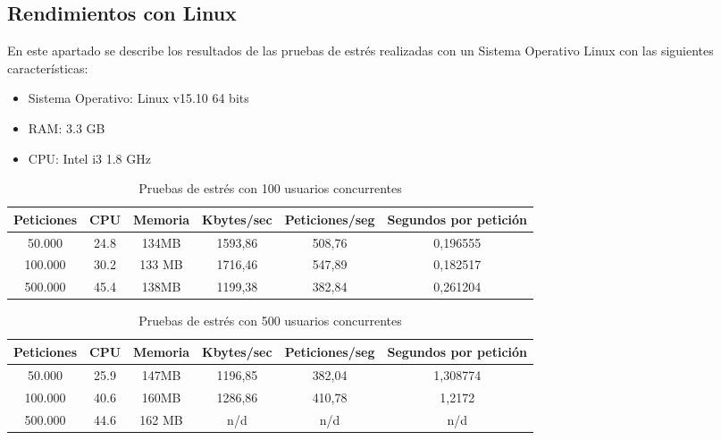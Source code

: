 \subsection{Rendimientos con Linux}

En este apartado se describe los resultados de las pruebas de estrés realizadas con un Sistema Operativo Linux con las siguientes características:

\begin{itemize}
	\item Sistema Operativo: Linux v15.10 64 bits
	\item RAM: 3.3 GB
	\item CPU: Intel i3 1.8 GHz
\end{itemize}

\begin{table}[H]
	\begin{center}
		\begin{tabular}{|c|c|c|c|c|c|}\hline
			Peticiones & CPU & Memoria & Kbytes/sec & Peticiones/seg & Segundos por petición \\ \hline
			50.000 & 24.8 & 134MB & 1593,86 & 508,76 & 0,196555 \\ \hline
			100.000 & 30.2 & 133 MB & 1716,46 & 547,89 & 0,182517 \\ \hline
			500.000 & 45.4 & 138MB & 1199,38 & 382,84 & 0,261204 \\ \hline
		\end{tabular}
		\caption{Pruebas de estrés con 100 usuarios concurrentes}
		\label{tabla:CienteUsuarios}
	\end{center}
\end{table}

\begin{table}[H]
	\begin{center}
		\begin{tabular}{|c|c|c|c|c|c|} 	\hline
			Peticiones & CPU & Memoria & Kbytes/sec & Peticiones/seg & Segundos por petición \\ \hline
			50.000 & 25.9 & 147MB & 1196,85 & 382,04 & 1,308774 \\ \hline
			100.000 & 40.6 & 160MB & 1286,86 & 410,78 & 1,2172 \\ \hline
			500.000 & 44.6 & 162 MB & n/d & n/d & n/d \\ \hline
		\end{tabular}
		\caption{Pruebas de estrés con 500 usuarios concurrentes}
		\label{tabla:QuinientosUsuarios}
	\end{center}
\end{table}

